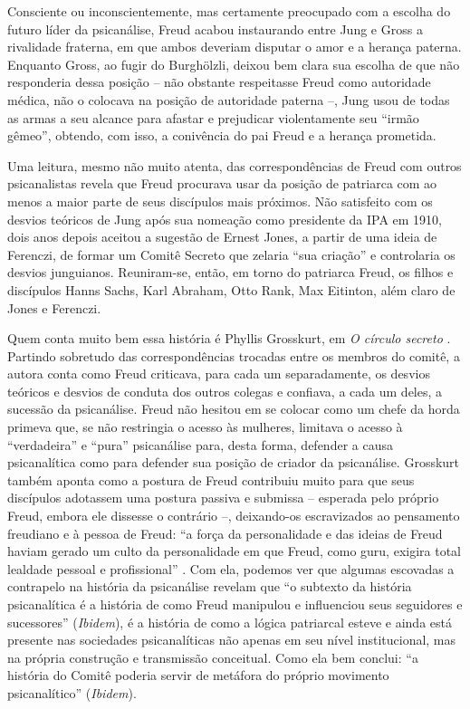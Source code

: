 Consciente ou inconscientemente, mas certamente preocupado com a escolha
do futuro líder da psicanálise, Freud acabou instaurando entre Jung e
Gross a rivalidade fraterna, em que ambos deveriam disputar o amor e a
herança paterna. Enquanto Gross, ao fugir do Burghölzli, deixou bem
clara sua escolha de que não responderia dessa posição -- não obstante
respeitasse Freud como autoridade médica, não o colocava na posição de
autoridade paterna --, Jung usou de todas as armas a seu alcance para
afastar e prejudicar violentamente seu ``irmão gêmeo'', obtendo, com
isso, a conivência do pai Freud e a herança prometida.

Uma leitura, mesmo não muito atenta, das correspondências de Freud com
outros psicanalistas revela que Freud procurava usar da posição de
patriarca com ao menos a maior parte de seus discípulos mais próximos.
Não satisfeito com os desvios teóricos de Jung após sua nomeação como
presidente da IPA em 1910, dois anos depois aceitou a sugestão de Ernest
Jones, a partir de uma ideia de Ferenczi, de formar um Comitê Secreto
que zelaria ``sua criação'' e controlaria os desvios junguianos.
Reuniram-se, então, em torno do patriarca Freud, os filhos e discípulos
Hanns Sachs, Karl Abraham, Otto Rank, Max Eitinton, além claro de Jones
e Ferenczi.

Quem conta muito bem essa história é Phyllis Grosskurt, em \emph{O
círculo secreto} . Partindo sobretudo das correspondências trocadas
entre os membros do comitê, a autora conta como Freud criticava, para
cada um separadamente, os desvios teóricos e desvios de conduta dos
outros colegas e confiava, a cada um deles, a sucessão da psicanálise.
Freud não hesitou em se colocar como um chefe da horda primeva que, se
não restringia o acesso às mulheres, limitava o acesso à ``verdadeira''
e ``pura'' psicanálise para, desta forma, defender a causa psicanalítica
como para defender sua posição de criador da psicanálise. Grosskurt
também aponta como a postura de Freud contribuiu muito para que seus
discípulos adotassem uma postura passiva e submissa -- esperada pelo
próprio Freud, embora ele dissesse o contrário --, deixando-os
escravizados ao pensamento freudiano e à pessoa de Freud: ``a força da
personalidade e das ideias de Freud haviam gerado um culto da
personalidade em que Freud, como guru, exigira total lealdade pessoal e
profissional'' . Com ela, podemos ver que algumas escovadas a contrapelo
na história da psicanálise revelam que ``o subtexto da história
psicanalítica é a história de como Freud manipulou e influenciou seus
seguidores e sucessores'' (\emph{Ibidem}), é a história de como a lógica
patriarcal esteve e ainda está presente nas sociedades psicanalíticas
não apenas em seu nível institucional, mas na própria construção e
transmissão conceitual. Como ela bem conclui: ``a história do Comitê
poderia servir de metáfora do próprio movimento psicanalítico''
(\emph{Ibidem}).

